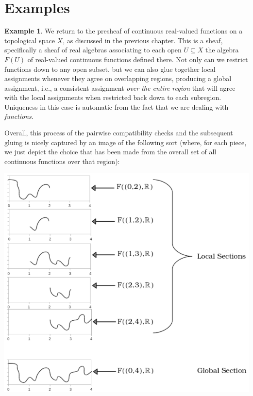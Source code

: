 \documentclass[11pt]{book}
\theoremstyle{definition}
\newtheorem{example}{Example}[section]
\theoremstyle{definition}
\theoremstyle{definition}
\theoremstyle{theorem}
\theoremstyle{definition}
\begin{document}
	\section{Examples}
	\begin{example}
		We return to the presheaf of continuous real-valued functions on a topological space $X$, as discussed in the previous chapter. This is a sheaf, specifically a sheaf of real algebras associating to each open $U \subseteq  X$ the algebra $F(U)$ of real-valued continuous functions defined there. Not only can we restrict functions down to any open subset, but we can also glue together local assignments whenever they agree on overlapping regions, producing a global assignment, i.e., a consistent assignment \textit{over the entire region} that will agree with the local assignments when restricted back down to each subregion. Uniqueness in this case is automatic from the fact that we are dealing with \textit{functions}. \par 
		Overall, this process of the pairwise compatibility checks and the subsequent gluing is nicely captured by an image of the following sort (where, for each piece, we just depict the choice that has been made from the overall set of all continuous functions over that region):      
		\begin{center}  
		\includegraphics[scale=0.45]{SheafofContinuousFunctions.png}
		\end{center} 
	\end{example}
\end{document}
